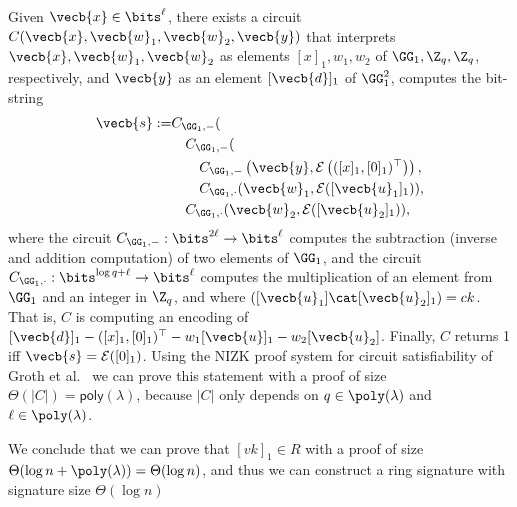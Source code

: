 Given \(\vecb{x}\in\bits^\ell\), there exists a circuit \(C(\vecb{x},\vecb{w}_1,\vecb{w}_2,\vecb{y})\) that interprets \(\vecb{x},\vecb{w}_1,\vecb{w}_2\) as  elements \([x]_1,w_1,w_2\) of \(\GG_1,\Z_q,\Z_q\), respectively, and \(\vecb{y}\) as an element \([\vecb{d}]_1\) of \(\GG_1^2\), computes the bit-string
\begin{align*}
\vecb{s}:=
    &C_{\GG_1,-}(\\
        &\quad C_{\GG_1,-}(\\
            &\qquad C_{\GG_1,-}\left(
                \vecb{y},
                \mathcal{E}\left(
                        ({[x]_1},{[0]_1})^\top\right)\right),\\
            &\qquad C_{\GG_1,\cdot}(
                        \vecb{w}_1,
                        \mathcal{E}([\vecb{u}_1]_1)),\\
        &\quad C_{\GG_1,\cdot}(
                    \vecb{w}_2,
                    \mathcal{E}([\vecb{u}_2]_1)),
\end{align*}
where the circuit $C_{\GG_1,-}:\bits^{2\ell}\to\bits^\ell$ computes the subtraction (inverse and addition computation) of two elements of $\GG_1$, and the circuit $C_{\GG_1,\cdot}:\bits^{\log q+\ell}\to\bits^\ell$ computes the multiplication of an element from $\GG_1$ and an integer in $\Z_q$, and where \(([\vecb{u}_1]\cat[\vecb{u}_2]_1)=ck\). That is, $C$ is computing an encoding of $[\vecb{d}]_1-([x]_1,[0]_1)^\top-w_1[\vecb{u}]_1-w_2[\vecb{u}_2]$. Finally, $C$ returns 1 iff \(\vecb{s}=\mathcal{E}([0]_1)\). Using the NIZK proof system for circuit satisfiability of Groth et al.~\cite{EC:GroOstSah06} we can prove this statement with a proof of size \(\Theta(|C|)=\mathsf{poly}(\lambda)\), because \(|C|\) only depends on \(q\in\poly(\lambda)\) and \(\ell\in\poly(\lambda)\).

We conclude that we can prove that \([vk]_1\in R\) with a proof of size \(\Theta(\log n +\poly(\lambda))=\Theta(\log n)\), and thus we can construct a ring signature with signature size \(\Theta(\log n)\)
